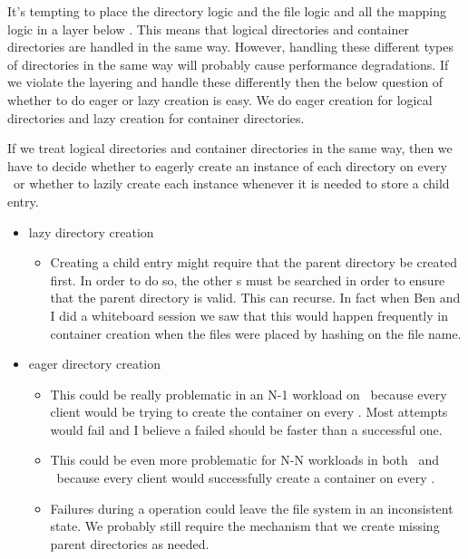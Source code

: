 \documentclass[10pt]{article}
\begin{document}
It's tempting to place the directory logic and the file logic and all the
mapping logic in a layer below \plfs.  This means that logical directories
and container directories are handled in the same way.  However, handling
these different types of directories in the same way will probably cause
performance degradations.  If we violate the layering and handle these
differently then the below question of whether to do eager or lazy creation
is easy.  We do eager creation for logical directories and lazy creation
for container directories.

If we treat logical directories and container directories in the same way, then
we have to decide whether to eagerly create an instance of each directory on
every \store\ or whether to lazily create each instance whenever it is needed
to store a child entry.


\begin{itemize}
\item{lazy directory creation}
\begin{itemize}
\item{Creating a child entry might require that the parent directory be
created first.  In order to do so, the other {\store}s must be searched
in order to ensure that the parent directory is valid.  This can recurse.  
In fact when Ben and I did a whiteboard
session we saw that this would happen frequently in container creation 
when the files were placed by hashing on the file name.}
\end{itemize}
\item{eager directory creation}
\begin{itemize}
\item{This could be really problematic in an N-1 workload on \fuse\ because 
every client would be trying to create the container on every \store. Most
attempts would fail and I believe a failed  should be faster
than a successful one.}
\item{This could be even more problematic for N-N workloads in both \fuse\
and \adio\ because every client would successfully create a container on
every \store.}
\item{Failures during a  operation could leave the file system
in an inconsistent state.  We probably still require the mechanism that
we create missing parent directories as needed.}
\end{itemize}
\end{itemize}
\end{document}
